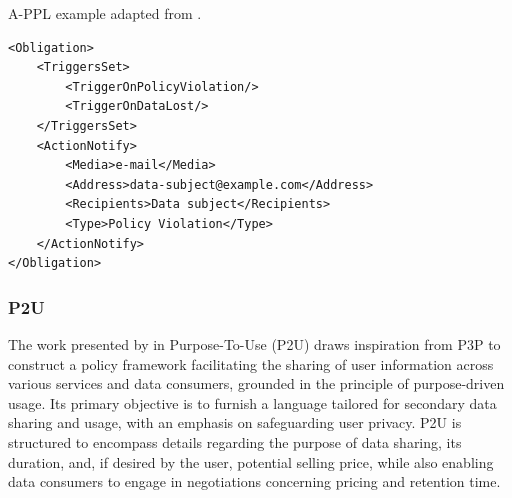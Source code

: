 \begin{listing}[ht]
\caption{A-PPL example adapted from \cite{azraoui_appl_2014}.}
\label{list:appl_example}
\begin{verbatim}
<Obligation>
    <TriggersSet>
        <TriggerOnPolicyViolation/>
        <TriggerOnDataLost/>
    </TriggersSet>
    <ActionNotify>
        <Media>e-mail</Media>
        <Address>data-subject@example.com</Address>
        <Recipients>Data subject</Recipients>
        <Type>Policy Violation</Type>
    </ActionNotify>
</Obligation>
\end{verbatim}
\end{listing}

\subsubsection{P2U}
\label{sec:p2u}

The work presented by \cite{iyilade_p2u_2014} in Purpose-To-Use (P2U) draws inspiration from P3P to construct a policy framework facilitating the sharing of user information across various services and data consumers, grounded in the principle of purpose-driven usage.
Its primary objective is to furnish a language tailored for secondary data sharing and usage, with an emphasis on safeguarding user privacy. 
P2U is structured to encompass details regarding the purpose of data sharing, its duration, and, if desired by the user, potential selling price, while also enabling data consumers to engage in negotiations concerning pricing and retention time.

